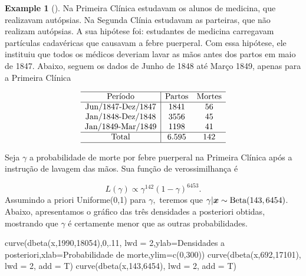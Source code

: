 \documentclass[
  letterpaper,
  DIV=11,
  numbers=noendperiod]{scrreprt}
\newenvironment{Shaded}{\begin{snugshade}}{\end{snugshade}}
\newcommand{\AttributeTok}[1]{\textcolor[rgb]{0.40,0.45,0.13}{#1}}
\newcommand{\DecValTok}[1]{\textcolor[rgb]{0.68,0.00,0.00}{#1}}
\newcommand{\FunctionTok}[1]{\textcolor[rgb]{0.28,0.35,0.67}{#1}}
\newcommand{\NormalTok}[1]{\textcolor[rgb]{0.00,0.23,0.31}{#1}}
\newcommand{\StringTok}[1]{\textcolor[rgb]{0.13,0.47,0.30}{#1}}
\theoremstyle{plain}
\theoremstyle{definition}
\newtheorem{example}{Example}[chapter]
\theoremstyle{definition}
\theoremstyle{remark}
\begin{document}
\begin{example}[]
Na Primeira Clínica estudavam os alunos de medicina, que realizavam
autópsias. Na Segunda Clínia estudavam as parteiras, que não realizam
autópsias. A sua hipótese foi: estudantes de medicina carregavam
partículas cadavéricas que causavam a febre puerperal. Com essa
hipótese, ele instituiu que todos os médicos deveriam lavar as mãos
antes dos partos em maio de 1847. Abaixo, seguem os dados de Junho de
1848 até Março 1849, apenas para a Primeira Clínica

\[\begin{array}{c|cc} \hline \hbox{Período} & \hbox{Partos} & \hbox{Mortes}\\ \hline
\hbox{Jun/1847-Dez/1847} & 1841 & 56 \\ 
\hbox{Jan/1848-Dez/1848} & 3556 & 45 \\ 
\hbox{Jan/1849-Mar/1849} & 1198 & 41 \\ \hline
\hbox{Total} & 6.595 & 142 \\ \hline
\end{array}\]

Seja \(\gamma\) a probabilidade de morte por febre puerperal na Primeira
Clínica após a instrução de lavagem das mãos. Sua função de
verossimilhança é

\[L(\gamma)\propto \gamma^{142}(1-\gamma)^{6453}.\] Assumindo a priori
Uniforme(0,1) para \(\gamma,\) teremos que
\(\gamma|\boldsymbol{x}\sim\hbox{Beta}(143,6454)\). Abaixo, apresentamos
o gráfico das três densidades a posteriori obtidas, mostrando que
\(\gamma\) é certamente menor que as outras probabilidades.

\begin{Shaded}
\begin{Highlighting}[]
\FunctionTok{curve}\NormalTok{(}\FunctionTok{dbeta}\NormalTok{(x,}\DecValTok{1990}\NormalTok{,}\DecValTok{18054}\NormalTok{),}\DecValTok{0}\NormalTok{,.}\DecValTok{11}\NormalTok{, }\AttributeTok{lwd =} \DecValTok{2}\NormalTok{,}\AttributeTok{ylab=}\StringTok{\textquotesingle{}Densidades a posteriori\textquotesingle{}}\NormalTok{,}\AttributeTok{xlab=}\StringTok{\textquotesingle{}Probabilidade de morte\textquotesingle{}}\NormalTok{,}\AttributeTok{ylim=}\FunctionTok{c}\NormalTok{(}\DecValTok{0}\NormalTok{,}\DecValTok{300}\NormalTok{))}
\FunctionTok{curve}\NormalTok{(}\FunctionTok{dbeta}\NormalTok{(x,}\DecValTok{692}\NormalTok{,}\DecValTok{17101}\NormalTok{), }\AttributeTok{lwd =} \DecValTok{2}\NormalTok{, }\AttributeTok{add =}\NormalTok{ T)}
\FunctionTok{curve}\NormalTok{(}\FunctionTok{dbeta}\NormalTok{(x,}\DecValTok{143}\NormalTok{,}\DecValTok{6454}\NormalTok{), }\AttributeTok{lwd =} \DecValTok{2}\NormalTok{, }\AttributeTok{add =}\NormalTok{ T)}


\end{Highlighting}
\end{Shaded}
\end{example}
\end{document}
